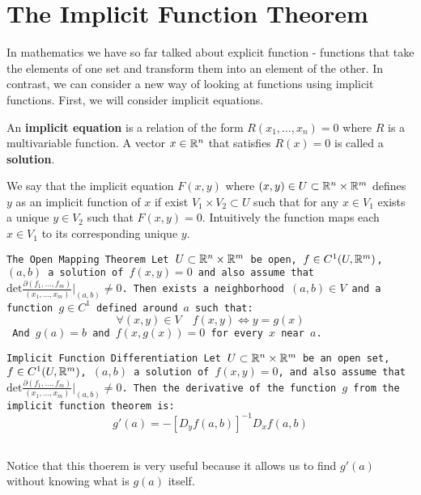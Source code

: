 \documentclass[11pt,a4paper]{article}
\begin{document}
	\newpage
	
	
	\section{The Implicit Function Theorem}
	In mathematics we have so far talked about explicit function - functions
	that take the elements of one set and transform them into an element
	of the other. In contrast, we can consider a new way of looking at
	functions using implicit functions. First, we will consider 
	implicit equations.
	\begin{definition}
		An \textbf{implicit equation} is a relation of the form 
		$R(x_1,\dots,x_n) = 0$ where $R$ is a multivariable function.
		A vector $x \in \mathbb{R}^n$ that satisfies $R(x) = 0$ is called a
		\textbf{solution}.
	\end{definition}
	We say that the implicit equation $F(x,y)$ where 
	$(x,y) \in U \subset \mathbb{R}^n \times \mathbb{R}^m$ defines $y$ as an implicit 
	function of $x$ if exist $V_1 \times V_2 \subset U$ such that 
	for any $x \in V_1$ exists a unique $y \in V_2$ such that $F(x,y) = 0$.
	Intuitively the function maps each $x \in V_1$ to its corresponding
	unique $y$.
	\begin{theorem}
		\tt{The Open Mapping Theorem}
		Let $U \subset \mathbb{R}^n \times \mathbb{R}^m$ be open, $f \in C^1(U,\mathbb{R}^m)$, $(a,b)$ 
		a solution of $f(x,y) = 0$ and also assume that $\mathrm{det}
		\frac{\partial(f_1,\dots,f_m)}{(x_1,\dots,x_m)}\vert_{(a,b)} \neq 0$.
		Then exists a neighborhood $(a,b) \in V$ and a function $g \in C^1$ 
		defined around $a$ such that:
		\[
			\forall (x,y) \in V \quad f(x,y) \iff y = g(x)
		\]
		And $g(a) = b$ and $f(x,g(x)) = 0$ for every $x$ near $a$.
	\end{theorem}
	\begin{theorem}
		\tt{Implicit Function Differentiation}
		Let $U \subset \mathbb{R}^n \times \mathbb{R}^m$ be an open set, $f \in C^1(U,\mathbb{R}^m)$, 
		$(a,b)$ a solution of $f(x,y) = 0$, and also assume that $\mathrm{det}
		\frac{\partial(f_1,\dots,f_m)}{(x_1,\dots,x_m)}\vert_{(a,b)} \neq 0$.
		Then the derivative of the function $g$ from the implicit function
		theorem is:
		\[
			g'(a) = -[D_y f(a,b)]^{-1} D_x f(a,b)
		\]
	\end{theorem}
	Notice that this thoerem is very useful because it allows us to find
	$g'(a)$ without knowing what is $g(a)$ itself.
  
	
	\newpage
	
\end{document}
